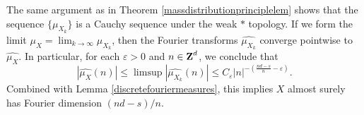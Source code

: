 The same argument as in Theorem \ref{massdistributionprinciplelem} shows that the sequence $\{ \mu_{X_k} \}$ is a Cauchy sequence under the weak $*$ topology. If we form the limit $\mu_X = \lim_{k \to \infty} \mu_{X_k}$, then the Fourier transforms $\widehat{\mu_{X_k}}$ converge pointwise to $\widehat{\mu_X}$. In particular, for each $\varepsilon > 0$ and $n \in \operatorname{\mathbf{Z}}^d$, we conclude that
%
\[ |\widehat{\mu_X}(n)| \leq \limsup |\widehat{\mu_{X_k}}(n)| \leq C_\varepsilon |n|^{- \left( \frac{nd - s}{n} - \varepsilon \right)}. \]
%
Combined with Lemma \ref{discretefouriermeasures}, this implies $X$ almost surely has Fourier dimension $(nd - s)/n$.

\endinput